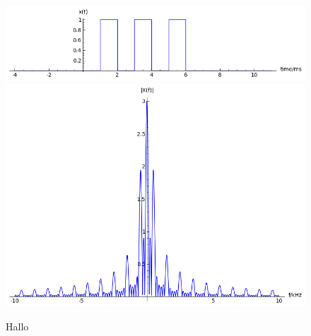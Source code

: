 \documentclass[a4paper, 11pt]{scrreprt}
\begin{document}
\begin{figure}[htpb]
\centering
\includegraphics[height=0.20\textwidth]{x(t).png}
\includegraphics[height=0.80\textwidth]{X(f).png}
\caption{Hallo}

\end{figure}


\nocite{marks02}
\nocite{fornasier03}



\end{document}

